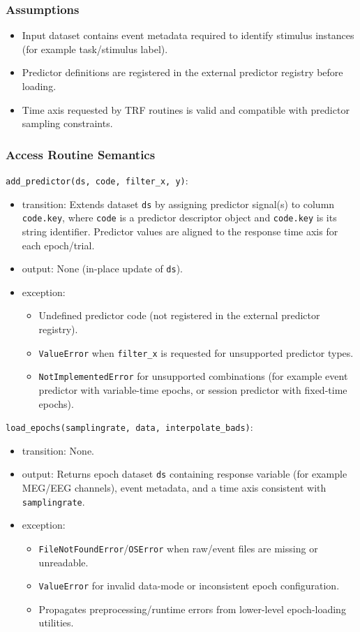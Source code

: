 \documentclass[12pt, titlepage]{article}
\begin{document}
\subsubsection{Assumptions}

\begin{itemize}
\item Input dataset contains event metadata required to identify stimulus
instances (for example task/stimulus label).
\item Predictor definitions are registered in the external predictor registry before loading.
\item Time axis requested by TRF routines is valid and compatible with predictor
sampling constraints.
\end{itemize}

\subsubsection{Access Routine Semantics}

\noindent \texttt{add\_predictor(ds, code, filter\_x, y)}:
\begin{itemize}
\item transition: Extends dataset \texttt{ds} by assigning predictor signal(s) to
column \texttt{code.key}, where \texttt{code} is a predictor descriptor object and \texttt{code.key} is its string identifier. Predictor values are aligned to the response time axis
for each epoch/trial.
\item output: None (in-place update of \texttt{ds}).
\item exception:
\begin{itemize}
\item Undefined predictor code (not registered in the external predictor registry).
\item \texttt{ValueError} when \texttt{filter\_x} is requested for unsupported
predictor types.
\item \texttt{NotImplementedError} for unsupported combinations (for example
event predictor with variable-time epochs, or session predictor with fixed-time
epochs).
\end{itemize}
\end{itemize}

\noindent \texttt{load\_epochs(samplingrate, data, interpolate\_bads)}:
\begin{itemize}
\item transition: None.
\item output: Returns epoch dataset \texttt{ds} containing response variable
(for example MEG/EEG channels), event metadata, and a time axis consistent with
\texttt{samplingrate}.
\item exception:
\begin{itemize}
\item \texttt{FileNotFoundError}/\texttt{OSError} when raw/event files are
missing or unreadable.
\item \texttt{ValueError} for invalid data-mode or inconsistent epoch
configuration.
\item Propagates preprocessing/runtime errors from lower-level epoch-loading
utilities.
\end{itemize}
\end{itemize}
\end{document}
